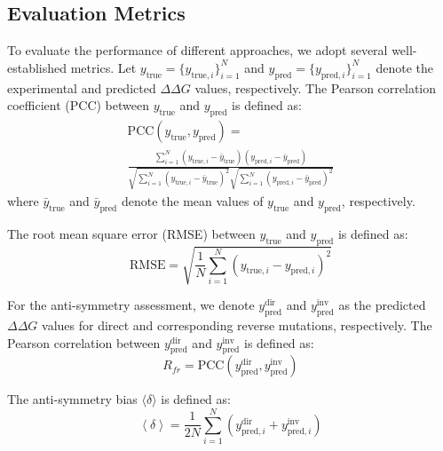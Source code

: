\documentclass[journal,twoside,web]{ieeecolor}
\begin{document}
\subsection{Evaluation Metrics}
\label{subsec:metrics}

To evaluate the performance of different approaches, we adopt several well-established metrics. Let $y_{\text{true}} = \{ y_{\text{true},i}\}_{i = 1}^{N}$ and $y_{\text{pred}} = \{ y_{\text{pred},i}\}_{i = 1}^{N}$ denote the experimental and predicted $\Delta\Delta G$ values, respectively. The Pearson correlation coefficient (PCC) between $y_{\text{true}}$ and $y_{\text{pred}}$ is defined as:
\begin{multline}
\text{PCC}(y_{\text{true}},y_{\text{pred}}) = \\
\frac{\sum_{i = 1}^{N}(y_{\text{true},i} - \bar{y}_{\text{true}})(y_{\text{pred},i} - \bar{y}_{\text{pred}})}{\sqrt{\sum_{i = 1}^{N}(y_{\text{true},i} - \bar{y}_{\text{true}})^{2}}\sqrt{\sum_{i = 1}^{N}(y_{\text{pred},i} - \bar{y}_{\text{pred}})^{2}}}
\label{eq:pcc}
\end{multline}
where $\bar{y}_{\text{true}}$ and $\bar{y}_{\text{pred}}$ denote the mean values of $y_{\text{true}}$ and $y_{\text{pred}}$, respectively.

The root mean square error (RMSE) between $y_{\text{true}}$ and $y_{\text{pred}}$ is defined as:
\begin{equation}
\text{RMSE} = \sqrt{\frac{1}{N}\sum_{i = 1}^{N}(y_{\text{true},i} - y_{\text{pred},i})^{2}}
\label{eq:rmse}
\end{equation}

For the anti-symmetry assessment, we denote $y_{\text{pred}}^{\text{dir}}$ and $y_{\text{pred}}^{\text{inv}}$ as the predicted $\Delta\Delta G$ values for direct and corresponding reverse mutations, respectively. The Pearson correlation between $y_{\text{pred}}^{\text{dir}}$ and $y_{\text{pred}}^{\text{inv}}$ is defined as:
\begin{equation}
R_{fr}= \text{PCC}\left( y_{\text{pred}}^{\text{dir}},y_{\text{pred}}^{\text{inv}} \right)
\label{eq:rdr}
\end{equation}

The anti-symmetry bias $\langle\delta\rangle$ is defined as:
\begin{equation}
\left\langle \delta \right\rangle = \frac{1}{2N}\sum_{i = 1}^{N}\left( y_{\text{pred},i}^{\text{dir}} + y_{\text{pred},i}^{\text{inv}} \right)
\label{eq:bias}
\end{equation}
\end{document}
